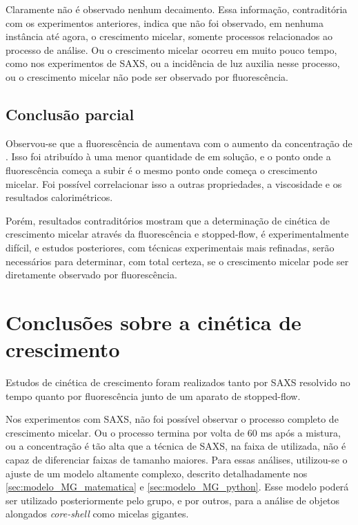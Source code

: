 	Claramente não é observado nenhum decaimento. Essa informação, contraditória com os experimentos anteriores, indica que não foi observado, em nenhuma instância até agora, o crescimento micelar, somente processos relacionados ao processo de análise. Ou o crescimento micelar ocorreu em muito pouco tempo, como nos experimentos de SAXS, ou a incidência de luz auxilia nesse processo, ou o crescimento micelar não pode ser observado por fluorescência.
	
	\section{Conclusão parcial}	 
	
	Observou-se que a fluorescência de \Sal{} aumentava com o aumento da concentração de \TTAB. Isso foi atribuído à uma menor quantidade de \Sal{} em solução, e o ponto onde a fluorescência começa a subir é o mesmo ponto onde começa o crescimento micelar. Foi possível correlacionar isso a outras propriedades, a viscosidade e os resultados calorimétricos.
	
	Porém, resultados contraditórios mostram que a determinação de cinética de crescimento micelar através da fluorescência e stopped-flow, é experimentalmente difícil, e estudos posteriores, com técnicas experimentais mais refinadas, serão necessários para determinar, com total certeza, se o crescimento micelar pode ser diretamente observado por fluorescência.
	
	\chapter{Conclusões sobre a cinética de crescimento} 
	
	Estudos de cinética de crescimento foram realizados tanto por SAXS resolvido no tempo quanto por fluorescência junto de um aparato de stopped-flow.
	
	Nos experimentos com SAXS, não foi possível observar o processo completo de crescimento micelar. Ou o processo termina por volta de 60 ms após a mistura, ou a concentração é tão alta que a técnica de SAXS, na faixa de \q{} utilizada, não é capaz de diferenciar faixas de tamanho maiores. Para essas análises, utilizou-se o ajuste de um modelo altamente complexo, descrito detalhadamente nos \autoref{sec:modelo_MG_matematica} e \autoref{sec:modelo_MG_python}. Esse modelo poderá ser utilizado posteriormente pelo grupo, e por outros, para a análise de objetos alongados \emph{core-shell} como micelas gigantes.
	
